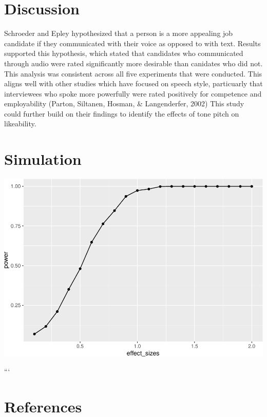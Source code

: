 \documentclass[man]{apa6}
\begin{document}
\hypertarget{discussion}{%
\section{Discussion}\label{discussion}}

Schroeder and Epley hypothesized that a person is a more appealing job candidate if they communicated with their voice as opposed to with text. Results supported this hypothesis, which stated that candidates who communicated through audio were rated significantly more desirable than canidates who did not. This analysis was consistent across all five experiments that were conducted. This aligns well with other studies which have focused on speech style, particuarly that interviewees who spoke more powerfully were rated positively for competence and employability (Parton, Siltanen, Hosman, \& Langenderfer, 2002) This study could further build on their findings to identify the effects of tone pitch on likeability.

\hypertarget{simulation}{%
\section{Simulation}\label{simulation}}

\includegraphics{SchroederEpley2015_files/figure-latex/unnamed-chunk-4-1.pdf}

```

\newpage

\hypertarget{references}{%
\section{References}\label{references}}
\end{document}

